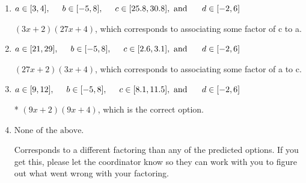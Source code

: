 \documentclass{extbook}[14pt]
\begin{document}
\begin{enumerate}
{\begin{enumerate}[label=\Alph*.]
 $(x + 18)(x + 36)$, which corresponds to factoring $x^{2} +54 x + 648$.
\item \( a \in [3, 4], \hspace*{5mm} b \in [-5, 8], \hspace*{5mm} c \in [25.8, 30.8], \text{ and } \hspace*{5mm} d \in [-2, 6] \)

 $(3x + 2)(27x + 4)$, which corresponds to associating some factor of c to a.
\item \( a \in [21, 29], \hspace*{5mm} b \in [-5, 8], \hspace*{5mm} c \in [2.6, 3.1], \text{ and } \hspace*{5mm} d \in [-2, 6] \)

 $(27x + 2)(3x + 4)$, which corresponds to associating some factor of a to c.
\item \( a \in [9, 12], \hspace*{5mm} b \in [-5, 8], \hspace*{5mm} c \in [8.1, 11.5], \text{ and } \hspace*{5mm} d \in [-2, 6] \)

* $(9x + 2)(9x + 4)$, which is the correct option.
\item \( \text{None of the above.} \)

 Corresponds to a different factoring than any of the predicted options. If you get this, please let the coordinator know so they can work with you to figure out what went wrong with your factoring.
\end{enumerate}

}
\end{enumerate}
\end{document}
